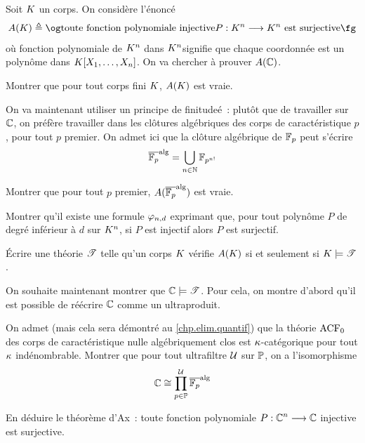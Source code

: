 \begin{problem}[Théorème d'Ax]
  Soit $K$ un corps. On considère l'énoncé
  \[A(\varKK) \defeq \ogM \text{toute fonction polynomiale injective}
  \makeFunName{P}{\varKK^n}{\varKK^n}\text{ est surjective}\fgM\]
  où \og fonction polynomiale de $K^n$ dans $K^n$\fg signifie que
  chaque coordonnée est un polynôme dans $K[X_1,\ldots,X_n]$.
  On va chercher à prouver $A(\mathbb C)$.


  \begin{pbQuest}
  \item Montrer que pour tout corps fini $K$, $A(K)$ est vraie.
  \end{pbQuest}

  On va maintenant utiliser un principe de finitudeé~: plutôt que de travailler
  sur $\mathbb C$, on préfère travailler dans les clôtures algébriques des corps de
  caractéristique $p$, pour tout $p$ premier. On admet ici que la clôture
  algébrique de $\mathbb F_p$ peut s'écrire
  \[\overline{\mathbb F_p}^{\mathrm{alg}} = \bigcup_{n \in \mathbb N} \mathbb F_{p^{n!}}\]
  \begin{pbQuest}[resume]
  \item Montrer que pour tout $p$ premier, $A(\overline{\mathbb F_{p}}^{\mathrm{alg}})$
    est vraie.
  \item Montrer qu'il existe une formule $\varphi_{n,d}$ exprimant que, pour tout
    polynôme $P$ de degré inférieur à $d$ sur $K^n$, si $P$ est injectif
    alors $P$ est surjectif.
  \item \'Ecrire une théorie $\mathscr T$ telle qu'un corps $K$ vérifie
    $A(K)$ si et seulement si $K\models\mathscr T$.
  \end{pbQuest}


  On souhaite maintenant montrer que $\mathbb C\models\mathscr T$. Pour cela, on montre
  d'abord qu'il est possible de réécrire $\mathbb C$ comme un ultraproduit.
  \begin{pbQuest}
  \item On admet (mais cela sera démontré au \cref{chp.elim.quantif}) que la
    théorie $\operatorname{ACF}_0$ des corps de caractéristique nulle algébriquement clos est
    $\kappa$-catégorique pour tout $\kappa$ indénombrable. Montrer que pour
    tout ultrafiltre $\mathcal{U}$ sur $\mathbb P$, on a l'isomorphisme
    \[\mathbb C\cong\prod_{p \in \mathbb P}^{\mathcal{U}} \overline{\mathbb F_p}^{\mathrm{alg}}\]
  \item En déduire le théorème d'Ax~: toute fonction polynomiale
    $P : \displaystyle \mathbb C^n \longrightarrow \mathbb C$ injective est surjective.
  \end{pbQuest}
\end{problem}
